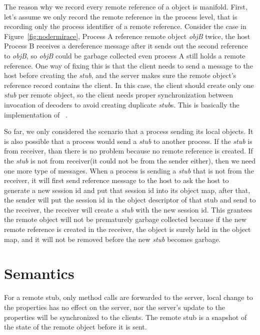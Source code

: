 \nodrmiracefig{}

The reason why we record every remote reference of a object is manifold.
First, let's assume we only record the remote reference in the process level,
that is recording only the process identifier of a remote reference.
Consider the case in Figure~\ref{fig:nodermirace},
Process A reference remote object \emph{objB} twice,
the host Process B receives a dereference message
after it sends out the second reference to \emph{objB},
so \emph{objB} could be garbage collected even process A still holds a remote
reference.
One way of fixing this is that
the client needs to send a message to the host before creating the \emph{stub},
and the server makes sure the remote object's reference record contains the client.
In this case, the client should create only one \emph{stub} per remote object,
so the client needs proper synchronization between invocation of decoders to
avoid creating duplicate \emph{stub}s. This is basically the implementation
of ~\cite{birrell1993distributed}. %


So far, we only considered the scenario that a process sending its local
objects.
It is also possible that a process would send a \emph{stub} to another process.
If the \emph{stub} is from receiver, than there is no problem because no remote
reference is created.
If the \emph{stub} is not from receiver(it could not be from the sender either),
then we need one more type of messages.
When a process is sending a \emph{stub} that is not from the receiver,
it will first send reference message to the host to ask the host
to generate a new session id and put that session id into its object map,
after that, the sender will put the session id in the object descriptor of that
stub and send to the receiver,
the receiver will create a \emph{stub} with the new session id.
This grantees the remote object will not be prematurely garbage collected
because if the new remote reference is created in the receiver,
the object is surely held in the object map,
and it will not be removed before the new \emph{stub} becomes garbage.


\section{Semantics}
For a remote stub, only method calls are forwarded to the server,
local change to the properties has no effect on the server,
nor the server's update to the properties will be synchronized to the clients.
The remote stub is a snapshot of the state of the remote object before it is sent.

